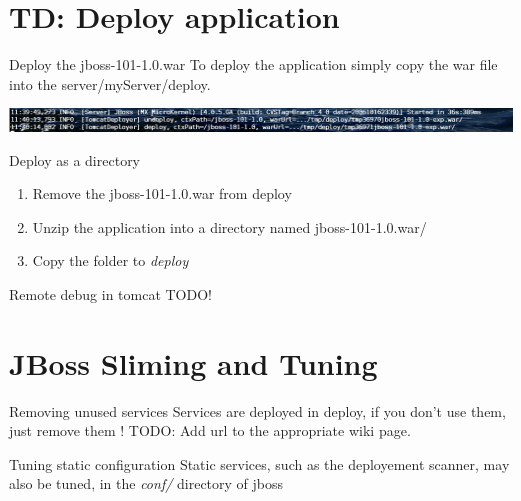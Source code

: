 \documentclass[handout]{beamer}
\begin{document}
\section{TD: Deploy application}
	\begin{frame}
		\begin{block}{Deploy the jboss-101-1.0.war}
		 	To deploy the application simply copy the war file into the server/myServer/deploy.
		\end{block}
		\begin{center}
			\includegraphics[scale=0.25]{../img/deploy-app.png}
		\end{center}
		\begin{block}{Deploy as a directory}
			\begin{enumerate}
				\item Remove the jboss-101-1.0.war from deploy
				\item Unzip the application into a directory named jboss-101-1.0.war/
				\item Copy the folder to \textit{deploy}
			\end{enumerate}
		\end{block}
	\end{frame}
	\begin{frame}
		\begin{block}{Remote debug in tomcat}
		 	TODO! 
		\end{block}
	\end{frame}
\section{JBoss Sliming and Tuning}
	\begin{frame}
		\begin{block}{Removing unused services}
			Services are deployed in deploy, if you don't use them, just remove them !
		 	TODO: Add url to the appropriate wiki page. 
		\end{block}
		\begin{block}{Tuning static configuration}
			Static services, such as the deployement scanner, may also be tuned, in the \textit{conf/} directory of jboss
		\end{block}
	\end{frame}
\end{document}
